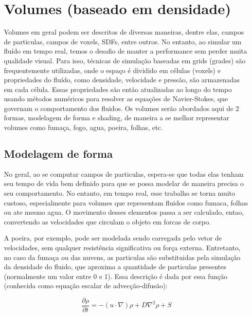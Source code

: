 \section{Volumes (baseado em densidade)}
\label{sec:volumes}

Volumes em geral podem ser descritos de diversas maneiras, dentre elas, campos de particulas, campos de voxels, SDFs, entre outros. No entanto, ao simular um fluído em tempo real, temos o desafio de manter a performance sem perder muita qualidade visual. Para isso, técnicas de simulação baseadas em grids (grades) são frequentemente utilizadas, onde o espaço é dividido em células (voxels) e propriedades do fluído, como densidade, velocidade e pressão, são armazenadas em cada célula. Essas propriedades são então atualizadas ao longo do tempo usando métodos numéricos para resolver as equações de Navier-Stokes, que governam o comportamento dos fluidos. Os volumes serão abordados aqui de 2 formas, modelagem de forma e shading, de maneira a se melhor representar volumes como fumaça, fogo, agua, poeira, folhas, etc.

\subsection{Modelagem de forma}
No geral, ao se computar campos de particulas, espera-se que todas elas tenham seu tempo de vida bem definido para que se possa modelar de maneira precisa o seu comportamento. No entanto, em tempo real, esse trabalho se torna muito custoso, especialmente para volumes que representam fluidos como fumaca, folhas ou ate mesmo agua. O movimento desses elementos passa a ser calculado, entao, convertendo as velocidades que circulam o objeto em forcas de corpo. 

A poeira, por exemplo, pode ser modelada sendo carregada pelo vetor de velocidades, sem qualquer resistência significativa ou força externa. Entretanto, no caso da fumaça ou das nuvens, as particulas são substituidas pela simulação da densidade do fluido, que aproxima a quantidade de particulas presentes (normalmente um valor entre 0 e 1). Essa descrição é dada por essa função (conhecida como equação escalar de advecção-difusão): 

$$
\frac{\partial \rho}{\partial t} = - (u \cdot \nabla) \rho + D \nabla^2 \rho + S
$$

